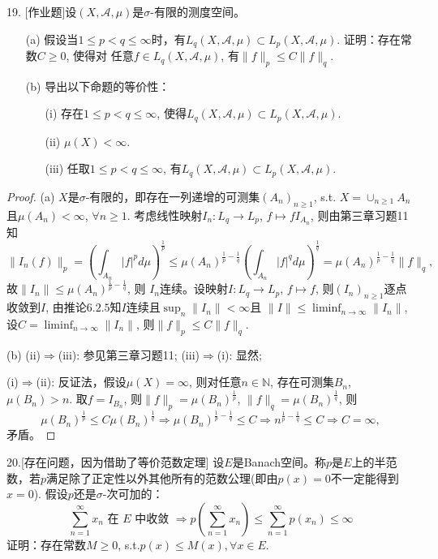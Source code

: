 \documentclass[a4paper,8pt]{ctexart}\textwidth 140mm \textheight 216mm
\newcommand{\8}{\infty}
\newcommand{\RA}{\Rightarrow}
\begin{document}
19. [作业题]设$(X,\mathcal{A},\mu)$是$\sigma$-有限的测度空间。
\begin{itemize}
	\item[(a)] 假设当$1\leq p<q\leq\infty$时，有$L_q(X,\mathcal{A},\mu)\subset L_p(X,\mathcal{A},\mu)$. 证明：存在常数$C\geq 0$, 使得对 任意$f\in L_q(X,\mathcal{A},\mu)$, 有$\|f\|_p\leq C\|f\|_q$.
	\item[(b)] 导出以下命题的等价性：
	\begin{itemize}
		\item[(i)] 存在$1\leq p<q\leq \infty$, 使得$L_q(X,\mathcal{A},\mu)\subset L_p(X,\mathcal{A},\mu)$.
		\item[(ii)] $\mu(X)<\infty$.
		\item[(iii)] 任取$1\leq p<q\leq \infty$, 有$L_q(X,\mathcal{A},\mu)\subset L_p(X,\mathcal{A},\mu)$. 
	\end{itemize}
\end{itemize}
\begin{proof}
	(a) $X$是$\sigma$-有限的，即存在一列递增的可测集$(A_n)_{n\geq 1}$, s.t. $X=\cup_{n\geq 1}A_n$且$\mu(A_n)<\infty$, $\forall n\geq 1$. 考虑线性映射$I_n:L_q\to L_p$, $f\mapsto fI_{A_n}$, 则由第三章习题11知
	$$\|I_n(f)\|_p=(\int_{A_n}|f|^pd\mu)^{\frac{1}{p}}\leq \mu(A_n)^{\frac{1}{p}-\frac{1}{q}}(\int_{A_n}|f|^qd\mu)^{\frac{1}{q}}=\mu(A_n)^{\frac{1}{p}-\frac{1}{q}}\|f\|_q,$$
	故$\|I_n\|\leq \mu(A_n)^{\frac{1}{p}-\frac{1}{q}}$, 则 $I_n$连续。设映射$I:L_q\to L_p$, $f\mapsto f$, 则$(I_n)_{n\geq 1}$逐点收敛到$I$, 由推论$6.2.5$知$I$连续且$\sup_{n}\|I_n\|<\infty$且
	$\|I\|\leq \liminf_{n\to\infty} \|I_n\|$, 设$C=\liminf_{n\to\infty} \|I_n\|$, 则$\|f\|_p\leq C\|f\|_q$.
	
	(b) (ii)$\RA$(iii): 参见第三章习题11; (iii)$\RA$(i): 显然;
	
	(i)$\RA$(ii): 反证法，假设$\mu(X)=\infty$, 则对任意$n\in\mathbb N$, 存在可测集$B_n$, $\mu(B_n)>n$. 取$f=I_{B_n}$, 则$\|f\|_p=\mu(B_n)^{\frac{1}{p}}$, $\|f\|_q=\mu(B_n)^{\frac{1}{q}}$, 则$$\mu(B_n)^{\frac{1}{p}}\leq C\mu(B_n)^{\frac{1}{q}} \RA\mu(B_n)^{\frac{1}{p}-\frac{1}{q}}\leq C\RA n^{\frac{1}{p}-\frac{1}{q}}\leq C\RA C=\infty,$$
	矛盾。
\end{proof}

%
%	
20.[{\color{red}存在问题，因为借助了等价范数定理}] 设$E$是Banach空间。称$p$是$E$上的半范数，若$p$满足除了正定性以外其他所有的范数公理(即由$p(x)=0$不一定能得到$x=0$). 假设$p$还是$\sigma$-次可加的：
\begin{equation*}
\sum_{n=1}^\infty x_n\mbox{ 在 }E\mbox{ 中收敛 }\Rightarrow p(\sum_{n=1}^\infty x_n)\leq\sum_{n=1}^\infty p(x_n)\leq \infty
\end{equation*}
证明：存在常数$M\geq 0$, s.t.$p(x)\leq M(x),\forall x\in E$.
\end{document}
